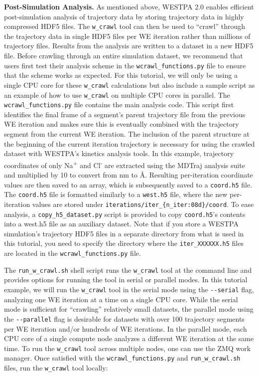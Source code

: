 \textbf{Post-Simulation Analysis.} As mentioned above, WESTPA 2.0 enables efficient post-simulation analysis of trajectory data by storing trajectory data in highly compressed HDF5 files. 
The \verb|w_crawl| tool can then be used to “crawl” through the trajectory data in single HDF5 files per WE iteration rather than millions of trajectory files.
Results from the analysis are written to a dataset in a new HDF5 file. 
Before crawling through an entire simulation dataset, we recommend that users first test their analysis scheme in the \verb|wcrawl_functions.py| file to ensure that the scheme works as expected. 
For this tutorial, we will only be using a single CPU core for these \verb|w_crawl| calculations but also include a sample script as an example of how to use \verb|w_crawl| on multiple CPU cores in parallel. 
The \verb|wcrawl_functions.py| file contains the main analysis code. 
This script first identifies the final frame of a segment’s parent trajectory file from the previous WE iteration and makes sure this is eventually combined with the trajectory segment from the current WE iteration. 
The inclusion of the parent structure at the beginning of the current iteration trajectory is necessary for using the crawled dataset with WESTPA’s kinetics analysis tools. 
In this example, trajectory coordinates of only Na\textsuperscript{+} and Cl\textsuperscript{-} are extracted using the MDTraj analysis suite and multiplied by 10 to convert from nm to \AA. 
Resulting per-iteration coordinate values are then saved to an array, which is subsequently saved to a \verb|coord.h5| file. 
The \verb|coord.h5| file is formatted similarly to a \verb|west.h5| file, where the new per-iteration values are stored under \verb|iterations/iter_{n_iter:08d}/coord|. 
To ease analysis, a \verb|copy_h5_dataset.py| script is provided to copy \verb|coord.h5|’s contents into a west.h5 file as an auxiliary dataset. 
Note that if you store a WESTPA simulation's trajectory HDF5 files in a separate directory from what is used in this tutorial, you need to specify the directory where the \verb|iter_XXXXXX.h5| files are located in the \verb|wcrawl_functions.py| file.

The \verb|run_w_crawl.sh| shell script runs the \verb|w_crawl| tool at the command line and provides options for running the tool in serial or parallel modes. 
In this tutorial example, we will run the \verb|w_crawl| tool in the serial mode using the \verb|--serial| flag, analyzing one WE iteration at a time on a single CPU core. 
While the serial mode is sufficient for “crawling” relatively small datasets, the parallel mode using the \verb|--parallel| flag is desirable for datasets with over 100 trajectory segments per WE iteration and/or hundreds of WE iterations. 
In the parallel mode, each CPU core of a single compute node analyzes a different WE iteration at the same time. 
To run the \verb|w_crawl| tool across multiple nodes, one can use the ZMQ work manager.
Once satisfied with the \verb|wcrawl_functions.py| and \verb|run_w_crawl.sh| files, run the \verb|w_crawl| tool locally:

